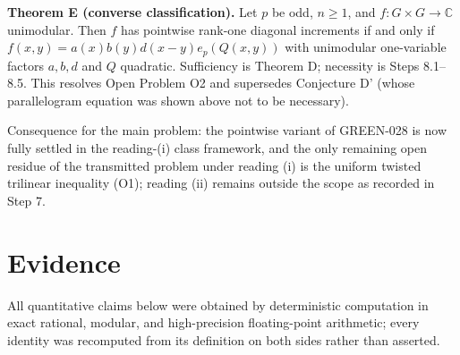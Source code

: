 \documentclass[11pt]{article}
\begin{document}
\textbf{Theorem E (converse classification).} Let $p$ be odd, $n\ge1$, and
$f:G\times G\to\mathbb{C}$ unimodular. Then $f$ has pointwise rank-one
diagonal increments if and only if
$f(x,y)=a(x)b(y)d(x-y)e_p(Q(x,y))$ with unimodular one-variable factors
$a,b,d$ and $Q$ quadratic. Sufficiency is Theorem D; necessity is Steps
8.1--8.5. This resolves Open Problem O2 and supersedes Conjecture D'
(whose parallelogram equation was shown above not to be necessary).

Consequence for the main problem: the pointwise variant of GREEN-028 is now
fully settled in the reading-(i) class framework, and the only remaining open
residue of the transmitted problem under reading (i) is the uniform twisted
trilinear inequality (O1); reading (ii) remains outside the scope as recorded
in Step 7.


\section*{Evidence}

All quantitative claims below were obtained by deterministic computation in
exact rational, modular, and high-precision floating-point arithmetic; every
identity was recomputed from its definition on both sides rather than asserted.
\end{document}

